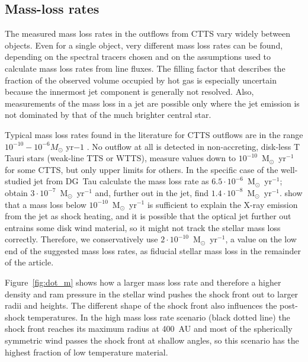 \subsection{Mass-loss rates}
The measured mass loss rates in the outflows from CTTS vary widely between objects.  Even for a single object, very different mass loss rates can be found, depending on the spectral tracers chosen and on the assumptions used to calculate mass loss rates from line fluxes. The filling factor that describes the fraction of the observed volume occupied by hot gas is especially uncertain because the innermost jet component is generally not resolved. Also, measurements of the mass loss in a jet are possible only where the jet emission is not dominated by that of the much brighter central star. 

Typical mass loss rates found in the literature for CTTS outflows are in the range $10^{-10}-10^{-6}M_{\odot}\textrm{ yr}{-1}$ \citep{1999A&A...342..717B,2006A&A...456..189P}. No outflow at all is detected in non-accreting, disk-less T Tauri stars (weak-line TTS or WTTS), \citet{2006ApJ...646..319E} measure values down to $10^{-10}$~M$_{\odot}$~yr$^{-1}$ for some CTTS, but only upper limits for others. In the specific case of the well-studied jet from DG~Tau \citet{1997A&A...327..671L} calculate the  mass loss rate as $6.5\cdot 10^{-6}$~M$_{\odot}$~yr$^{-1}$; \citet{1995ApJ...452..736H}
obtain $3\cdot 10^{-7}$~M$_{\odot}$~yr$^{-1}$ and, further out in the jet, \citet{2000A&A...356L..41L} find $1.4\cdot 10^{-8}$~M$_{\odot}$~yr$^{-1}$. 
\citet{2009A&A...493..579G} show that a mass loss below $10^{-10}$~M$_{\odot}$~yr$^{-1}$ is sufficient to explain the X-ray emission from the jet as shock heating, and it is possible that the optical jet further out entrains some disk wind material, so it might not track the stellar mass loss correctly.
Therefore, we conservatively use $2\cdot 10^{-10}$~M$_{\odot}$~yr$^{-1}$, a value on the low end of the suggested mass loss rates, as fiducial stellar mass loss in the remainder of the article.

Figure~\ref{fig:dot_m} shows how a larger mass loss rate and therefore a higher density and ram pressure in the stellar wind pushes the shock front out to larger radii and heights. The different shape of the shock front also influences the post-shock temperatures. In the high mass loss rate scenario (black dotted line) the shock front reaches its maximum radius at 400~AU and most of the spherically symmetric wind passes the shock front at shallow angles, so this scenario has the highest fraction of low temperature material.

